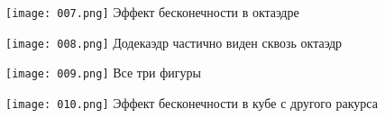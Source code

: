 \begin{center}
\texttt{[image: 007.png]}\newline\noindent
Эффект бесконечности в октаэдре
\end{center}
\begin{center}
\texttt{[image: 008.png]}\newline\noindent
Додекаэдр частично виден сквозь октаэдр
\end{center}
\pagebreak

\begin{center}
\texttt{[image: 009.png]}\newline\noindent
Все три фигуры
\end{center}
\begin{center}
\texttt{[image: 010.png]}\newline\noindent
Эффект бесконечности в кубе с другого ракурса
\end{center}
\pagebreak
